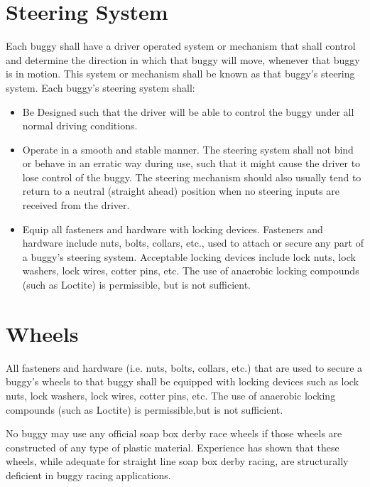 \section{Steering System}

	Each buggy shall have a driver operated system or mechanism that shall control
	and determine the direction in which that buggy will move, whenever that buggy
	is in motion. This system or mechanism shall be known as that buggy's steering
	system. Each buggy's steering system shall:

	\begin{itemize}

		\item
		Be Designed such that the driver will be able to
		control the buggy under all normal driving conditions.

		\item
		Operate in a smooth and stable manner. The steering
		system shall not bind or behave in an erratic way during use, such that it
		might cause the driver to lose control of the buggy. The steering mechanism
		should also usually tend to return to a neutral (straight ahead) position
		when no steering inputs are received from the driver.

		\item
		Equip all fasteners and hardware with locking devices. Fasteners and hardware
		include nuts, bolts, collars, etc., used to attach or secure any part of a buggy's
		steering system. Acceptable locking devices include lock nuts, lock washers, lock
		wires, cotter pins, etc. The use of anaerobic locking compounds (such as Loctite)
		is permissible, but is not sufficient.

	\end{itemize}

\section{Wheels}

	All fasteners and hardware (i.e. nuts, bolts, collars, etc.) that are used to
	secure a buggy's wheels to that buggy shall be equipped with locking devices
	such as lock nuts, lock washers, lock wires, cotter pins, etc. The use of
	anaerobic locking compounds (such as Loctite) is permissible,but is not
	sufficient.

	No buggy may use any official soap box derby race wheels if those wheels are
	constructed of any type of plastic material. Experience has shown that these
	wheels, while adequate for straight line soap box derby racing, are
	structurally deficient in buggy racing applications.


